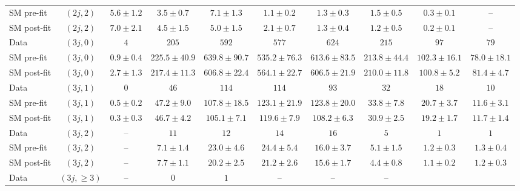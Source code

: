 \begin{table}[h!]
{\begin{tabular}{lccccccccc}
 SM pre-fit  & $(2j,2)$           & $5.6\pm1.2$      & $3.5\pm0.7$      & $7.1\pm1.3$    & $1.1\pm0.2$    & $1.3\pm0.3$    & $1.5\pm0.5$    & $0.3\pm0.1$    & --            \\[0.5ex]
 SM post-fit & $(2j,2)$           & $7.0\pm2.1$      & $4.5\pm1.5$      & $5.0\pm1.5$    & $2.1\pm0.7$    & $1.3\pm0.4$    & $1.2\pm0.5$    & $0.2\pm0.1$    & --            \\[0.5ex]
 Data        & $(3j,0)$           & $4$              & $205$            & $592$          & $577$          & $624$          & $215$          & $97$           & $79$          \\[0.5ex]
 SM pre-fit  & $(3j,0)$           & $0.9\pm0.4$      & $225.5\pm40.9$   & $639.8\pm90.7$ & $535.2\pm76.3$ & $613.6\pm83.5$ & $213.8\pm44.4$ & $102.3\pm16.1$ & $78.0\pm18.1$ \\[0.5ex]
 SM post-fit & $(3j,0)$           & $2.7\pm1.3$      & $217.4\pm11.3$   & $606.8\pm22.4$ & $564.1\pm22.7$ & $606.5\pm21.9$ & $210.0\pm11.8$ & $100.8\pm5.2$  & $81.4\pm4.7$  \\[0.5ex]
 Data        & $(3j,1)$           & $0$              & $46$             & $114$          & $114$          & $93$           & $32$           & $18$           & $10$          \\[0.5ex]
 SM pre-fit  & $(3j,1)$           & $0.5\pm0.2$      & $47.2\pm9.0$     & $107.8\pm18.5$ & $123.1\pm21.9$ & $123.8\pm20.0$ & $33.8\pm7.8$   & $20.7\pm3.7$   & $11.6\pm3.1$  \\[0.5ex]
 SM post-fit & $(3j,1)$           & $0.3\pm0.3$      & $46.7\pm4.2$     & $105.1\pm7.1$  & $119.6\pm7.9$  & $108.2\pm6.3$  & $30.9\pm2.5$   & $19.2\pm1.7$   & $11.7\pm1.4$  \\[0.5ex]
 Data        & $(3j,2)$           & --               & $11$             & $12$           & $14$           & $16$           & $5$            & $1$            & $1$           \\[0.5ex]
 SM pre-fit  & $(3j,2)$           & --               & $7.1\pm1.4$      & $23.0\pm4.6$   & $24.4\pm5.4$   & $16.0\pm3.7$   & $5.1\pm1.5$    & $1.2\pm0.3$    & $1.3\pm0.4$   \\[0.5ex]
 SM post-fit & $(3j,2)$           & --               & $7.7\pm1.1$      & $20.2\pm2.5$   & $21.2\pm2.6$   & $15.6\pm1.7$   & $4.4\pm0.8$    & $1.1\pm0.2$    & $1.2\pm0.3$   \\[0.5ex]
 Data        & $(3j,\geq 3)$      & --               & $0$              & $1$            & --             & --             & --                                              \\[0.5ex]

\end{tabular}}
\end{table}
